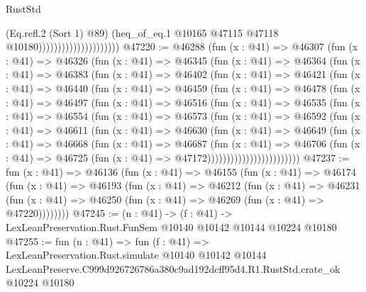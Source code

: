 \begin{lexlean}{RustStd}
\begin{coremodule}
                                            (Eq.refl.{2} (Sort 1) @89)
                                            (heq_of_eq.{1}
                                              @10165
                                              @47115
                                              @47118
                                              @10180)))))))))))))))))))))
@47220 := @46288
    (fun (x : @41) =>
    @46307
      (fun (x : @41) =>
      @46326
        (fun (x : @41) =>
        @46345
          (fun (x : @41) =>
          @46364
            (fun (x : @41) =>
            @46383
              (fun (x : @41) =>
              @46402
                (fun (x : @41) =>
                @46421
                  (fun (x : @41) =>
                  @46440
                    (fun (x : @41) =>
                    @46459
                      (fun (x : @41) =>
                      @46478
                        (fun (x : @41) =>
                        @46497
                          (fun (x : @41) =>
                          @46516
                            (fun (x : @41) =>
                            @46535
                              (fun (x : @41) =>
                              @46554
                                (fun (x : @41) =>
                                @46573
                                  (fun (x : @41) =>
                                  @46592
                                    (fun (x : @41) =>
                                    @46611
                                      (fun (x : @41) =>
                                      @46630
                                        (fun (x : @41) =>
                                        @46649
                                          (fun (x : @41) =>
                                          @46668
                                            (fun (x : @41) =>
                                            @46687
                                              (fun (x : @41) =>
                                              @46706
                                                (fun (x : @41) =>
                                                @46725
                                                  (fun (x : @41) => @47172))))))))))))))))))))))))
@47237 := fun (x : @41) =>
  @46136
    (fun (x : @41) =>
    @46155
      (fun (x : @41) =>
      @46174
        (fun (x : @41) =>
        @46193
          (fun (x : @41) =>
          @46212
            (fun (x : @41) =>
            @46231
              (fun (x : @41) => @46250 (fun (x : @41) => @46269 (fun (x : @41) => @47220))))))))
@47245 := (n : @41) ->
  (f : @41) -> LexLeanPreservation.Rust.FunSem @10140 @10142 @10144 @10224 @10180
@47255 := fun (n : @41) =>
  fun (f : @41) =>
  LexLeanPreservation.Rust.simulate
    @10140
    @10142
    @10144
    LexLeanPreserve.C999d926726786a380c9ad192dcff95d4.R1.RustStd.crate_ok
    @10224
    @10180
\end{coremodule}
\end{lexlean}
